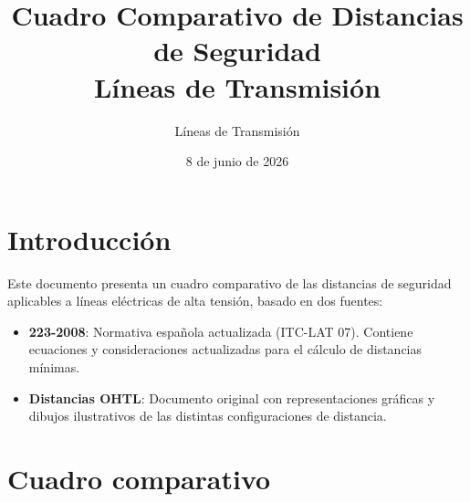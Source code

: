 \documentclass[12pt,a4paper]{article}
\title{Cuadro Comparativo de Distancias de Seguridad\\Líneas de Transmisión}
\author{Líneas de Transmisión}
\date{8 de junio de 2026}
\begin{document}
\maketitle

\section*{Introducción}

Este documento presenta un cuadro comparativo de las distancias de seguridad
aplicables a líneas eléctricas de alta tensión, basado en dos fuentes:

\begin{itemize}
    \item \textbf{223-2008}: Normativa española actualizada (ITC-LAT 07).
          Contiene ecuaciones y consideraciones actualizadas para el cálculo
          de distancias mínimas.
    \item \textbf{Distancias OHTL}: Documento original con representaciones
          gráficas y dibujos ilustrativos de las distintas configuraciones
          de distancia.
\end{itemize}

\newpage

\section{Cuadro comparativo}
\end{document}
